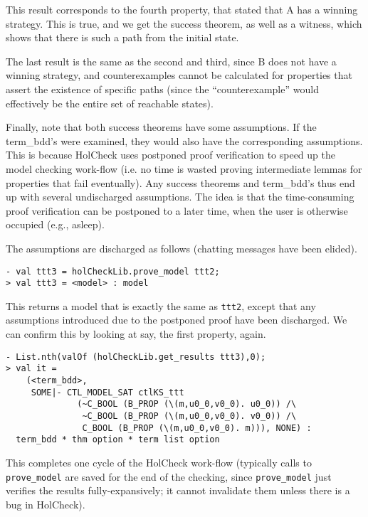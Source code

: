 \documentclass[12pt,fleqn]{article}
\newcommand{\hc}{HolCheck}
\begin{document}
This result corresponds to the fourth property, that stated that A has a winning strategy. This is true, and we get the success theorem, as well as a witness, which shows that there is such a path from the initial state.

The last result is the same as the second and third, since B does not have a winning strategy, and counterexamples cannot be calculated for properties that assert the existence of specific paths (since the ``counterexample'' would effectively be the entire set of reachable states).

Finally, note that both success theorems have some assumptions. If the term\_bdd's were examined, they would also have the corresponding assumptions. This is because \hc{} uses postponed proof verification to speed up the model checking work-flow (i.e. no time is wasted proving intermediate lemmas for properties that fail eventually). Any success theorems and term\_bdd's thus end up with several undischarged assumptions. The idea is that the time-consuming proof verification can be postponed to a later time, when the user is otherwise occupied (e.g., asleep).

The assumptions are discharged as follows (chatting messages have been elided).

\begin{session}\begin{verbatim}
- val ttt3 = holCheckLib.prove_model ttt2;
> val ttt3 = <model> : model
\end{verbatim}\end{session}

This returns a model that is exactly the same as \texttt{ttt2}, except that any assumptions introduced due to the postponed proof have been discharged. We can confirm this by looking at say, the first property, again.

\begin{session}\begin{verbatim}
- List.nth(valOf (holCheckLib.get_results ttt3),0);
> val it =
    (<term_bdd>,
     SOME|- CTL_MODEL_SAT ctlKS_ttt
              (~C_BOOL (B_PROP (\(m,u0_0,v0_0). u0_0)) /\
               ~C_BOOL (B_PROP (\(m,u0_0,v0_0). v0_0)) /\
               C_BOOL (B_PROP (\(m,u0_0,v0_0). m))), NONE) :
  term_bdd * thm option * term list option
\end{verbatim}\end{session}

This completes one cycle of the \hc{} work-flow (typically calls to \texttt{prove\_model} are saved for the end of the checking, since  \texttt{prove\_model} just verifies the results fully-expansively; it cannot invalidate them unless there is a bug in \hc{}).
\end{document}
